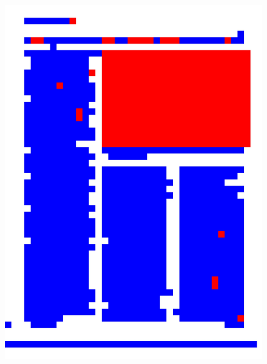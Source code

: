 \documentclass{book}
\begin{document}
\begin{figure}[H]
\begin{center}
\includegraphics[scale=0.06]{images/20_res_hog_hsv_kmeans.jpg}

\end{center}
\end{figure}
\end{document}
